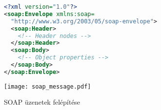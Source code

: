 \begin{figure}[h]
\centering
\begin{minipage}{0.73\textwidth}
\begin{mdframed}[backgroundcolor=gray!20]
\begin{scriptsize}
\begin{lstlisting}[language=XML]
<?xml version="1.0"?>
<soap:Envelope xmlns:soap=
  "http://www.w3.org/2003/05/soap-envelope">
  <soap:Header>
  	<!-- Header nodes -->
  </soap:Header>
  <soap:Body>
    <!-- Object properties -->
  </soap:Body>
</soap:Envelope>
\end{lstlisting}
\end{scriptsize}
\end{mdframed}
\end{minipage}
\hspace{0.5cm}
\begin{minipage}{0.21\textwidth}
\texttt{[image: soap\_message.pdf]}
\end{minipage}
\caption{SOAP üzenetek felépítése}
\label{figure:soap_message}
\end{figure}

